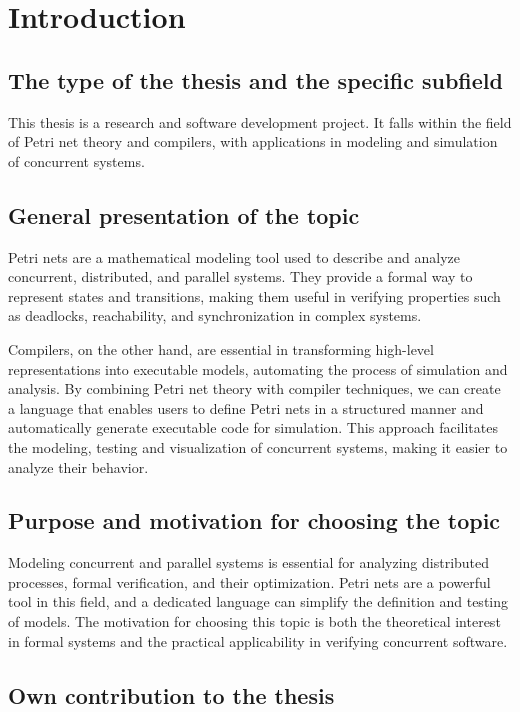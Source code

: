 \documentclass[12pt]{article}
\begin{document}
\section{Introduction}
    \subsection{The type of the thesis and the specific subfield}
    This thesis is a research and software development project. 
    It falls within the field of Petri net theory and compilers, 
    with applications in modeling and simulation of concurrent systems.

    \subsection{General presentation of the topic}

    Petri nets are a mathematical modeling tool used to describe and analyze concurrent, distributed, and parallel systems. 
    They provide a formal way to represent states and transitions, 
    making them useful in verifying properties such as 
    deadlocks, reachability, and synchronization in complex systems.

    Compilers, on the other hand, are essential in transforming high-level representations into executable models, 
    automating the process of simulation and analysis. 
    By combining Petri net theory with compiler techniques, 
    we can create a language that enables users to define Petri nets in a structured manner 
    and automatically generate executable code for simulation. 
    This approach facilitates the modeling, testing and visualization of 
    concurrent systems, making it easier to analyze their behavior.

    \subsection{Purpose and motivation for choosing the topic}

    Modeling concurrent and parallel systems is essential for analyzing distributed processes, 
    formal verification, and their optimization. 
    Petri nets are a powerful tool in this field, and a dedicated language can simplify 
    the definition and testing of models. 
    The motivation for choosing this topic is both the theoretical interest in formal systems 
    and the practical applicability in verifying concurrent software.

    \subsection{Own contribution to the thesis}
\end{document}
